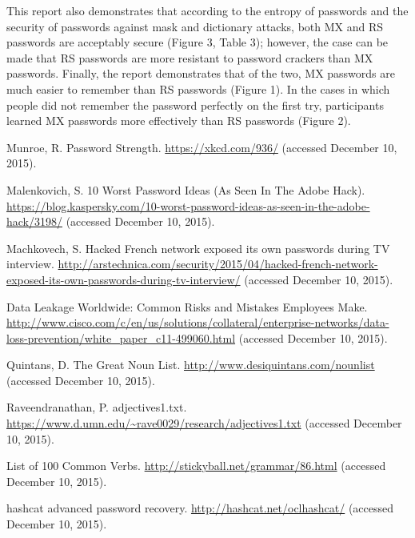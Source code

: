 \documentclass{article}
\begin{document}
This report also demonstrates that according to the entropy of passwords and the security of passwords against mask and dictionary attacks, both MX and RS passwords are acceptably secure (Figure 3, Table 3); however, the case can be made that RS passwords are more resistant to password crackers than MX passwords. Finally, the report demonstrates that of the two, MX passwords are much easier to remember than RS passwords (Figure 1). In the cases in which people did not remember the password perfectly on the first try, participants learned MX passwords more effectively than RS passwords (Figure 2).

\begin{thebibliography}{9}
Munroe, R. Password Strength. \url{https://xkcd.com/936/} (accessed December 10, 2015). 

Malenkovich, S. 10 Worst Password Ideas (As Seen In The Adobe Hack). \url{https://blog.kaspersky.com/10-worst-password-ideas-as-seen-in-the-adobe-hack/3198/} (accessed December 10, 2015).

Machkovech, S. Hacked French network exposed its own passwords during TV interview. \url{http://arstechnica.com/security/2015/04/hacked-french-network-exposed-its-own-passwords-during-tv-interview/} (accessed December 10, 2015).

Data Leakage Worldwide: Common Risks and Mistakes Employees Make. \url{http://www.cisco.com/c/en/us/solutions/collateral/enterprise-networks/data-loss-prevention/white_paper_c11-499060.html} (accessed December 10, 2015).

Quintans, D. The Great Noun List. \url{http://www.desiquintans.com/nounlist} (accessed December 10, 2015).

Raveendranathan, P. adjectives1.txt. \url{https://www.d.umn.edu/~rave0029/research/adjectives1.txt} (accessed December 10, 2015).

List of 100 Common Verbs. \url{http://stickyball.net/grammar/86.html} (accessed December 10, 2015).

hashcat advanced password recovery. \url{http://hashcat.net/oclhashcat/} (accessed December 10, 2015).

\end{thebibliography}

\FloatBarrier
\end{document}
